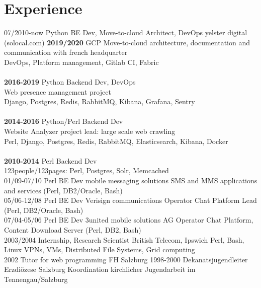 \documentclass[]{friggeri-cv}
\begin{document}
\section{Experience}
\begin{entrylist}
  \entry
    {07/2010-now}
    {Python BE Dev, Move-to-cloud Architect, DevOps}
    {yelster digital (solocal.com)}
    {\textbf{2019/2020} GCP Move-to-cloud architecture, documentation and communication with french headquarter\\DevOps, Platform management, Gitlab CI, Fabric\\\\
    \textbf{2016-2019} Python Backend Dev, DevOps\\Web presence management project\\Django, Postgres, Redis, RabbitMQ, Kibana, Grafana, Sentry\\\\
    \textbf{2014-2016} Python/Perl Backend Dev\\Website Analyzer project lead: large scale web crawling\\Perl, Django, Postgres, Redis, RabbitMQ, Elasticsearch, Kibana, Docker\\\\
    \textbf{2010-2014} Perl Backend Dev\\123people/123pages: Perl, Postgres, Solr, Memcached\\}
  \entry
    {01/09-07/10}
    {Perl BE Dev}
    {mobile messaging solutions}
    {SMS and MMS applications and services (Perl, DB2/Oracle, Bash)\\}
    \entry
    {05/06-12/08}
    {Perl BE Dev}
    {Verisign communications}
    {Operator Chat Platform Lead (Perl, DB2/Oracle, Bash)\\}
    \entry
    {07/04-05/06}
    {Perl BE Dev}
    {3united mobile solutions AG}
    {Operator Chat Platform, Content Download Server (Perl, DB2, Bash)\\}
    \entry
    {2003/2004}
    {Internship, Research Scientist}
    {British Telecom, Ipswich}
    {Perl, Bash, Linux VPNs, VMs, Distributed File Systems, Grid computing\\}
    \entry
    {2002}
    {Tutor for web programming}
    {FH Salzburg}
    {}
    \entry
    {1998-2000}
    {Dekanatsjugendleiter}
    {Erzdiözese Salzburg}
    {Koordination kirchlicher Jugendarbeit im Tennengau/Salzburg}
\end{entrylist}
\end{document}
